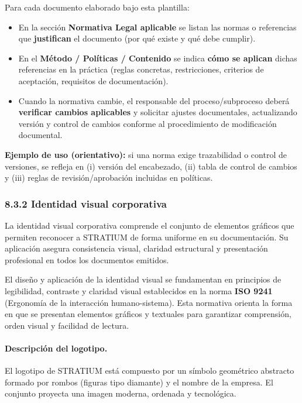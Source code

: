 \documentclass{encabezado}
\begin{document}
Para cada documento elaborado bajo esta plantilla:

\begin{itemize}
    \item En la sección \textbf{Normativa Legal aplicable} se listan las normas o referencias que \textbf{justifican} el documento (por qué existe y qué debe cumplir).
    \item En el \textbf{Método / Políticas / Contenido} se indica \textbf{cómo se aplican} dichas referencias en la práctica (reglas concretas, restricciones, criterios de aceptación, requisitos de documentación).
    \item Cuando la normativa cambie, el responsable del proceso/subproceso deberá \textbf{verificar cambios aplicables} y solicitar ajustes documentales, actualizando versión y control de cambios conforme al procedimiento de modificación documental.
\end{itemize}

\textbf{Ejemplo de uso (orientativo):} si una norma exige trazabilidad o control de versiones, se refleja en (i) versión del encabezado, (ii) tabla de control de cambios y (iii) reglas de revisión/aprobación incluidas en políticas.

\subsubsection*{8.3.2 Identidad visual corporativa}

La identidad visual corporativa comprende el conjunto de elementos gráficos que permiten reconocer a STRATIUM de forma uniforme en su documentación. Su aplicación asegura consistencia visual, claridad estructural y presentación profesional en todos los documentos emitidos.

El diseño y aplicación de la identidad visual se fundamentan en principios de legibilidad, contraste y claridad visual establecidos en la norma \textbf{ISO 9241} (Ergonomía de la interacción humano-sistema). Esta normativa orienta la forma en que se presentan elementos gráficos y textuales para garantizar comprensión, orden visual y facilidad de lectura.

\paragraph{Descripción del logotipo.}
El logotipo de STRATIUM está compuesto por un símbolo geométrico abstracto formado por rombos (figuras tipo diamante) y el nombre de la empresa. El conjunto proyecta una imagen moderna, ordenada y tecnológica.
\end{document}
